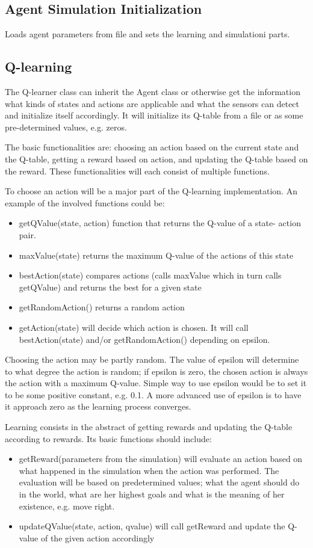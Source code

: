 \documentclass{article}
\begin{document}
\subsection{Agent Simulation Initialization}
Loads agent parameters from file and sets the learning and simulationi parts.


\subsection{Q-learning}
The Q-learner class can inherit the Agent class or otherwise get the information
what kinds of states and actions are applicable and what the sensors can detect
and initialize itself accordingly. It will initialize its Q-table from a file or
as some pre-determined values, e.g. zeros.

The basic functionalities are: choosing an action based on the current state and
the Q-table, getting a reward based on action, and updating the Q-table based on
the reward. These functionalities will each consist of multiple functions.

To choose an action will be a major part of the Q-learning implementation. An
example of the involved functions could be:
\begin{itemize}
  \item getQValue(state, action) function that returns the Q-value of a state-
    action pair.
  \item maxValue(state) returns the maximum Q-value of the actions of this state
  \item bestAction(state) compares actions (calls maxValue which in turn calls
    getQValue) and returns the best for a given state
  \item getRandomAction() returns a random action
  \item getAction(state) will decide which action is chosen. It will call
    bestAction(state) and/or getRandomAction() depending on epsilon.
\end{itemize}
Choosing the action may be partly random. The value of epsilon will determine to
what degree the action is random; if epsilon is zero, the chosen action is always
the action with a maximum Q-value. Simple way to use epsilon would be to set it
to be some positive constant, e.g. 0.1. A more advanced use of epsilon is to have
it approach zero as the learning process converges.

Learning consists in the abstract of getting rewards and updating the Q-table
according to rewards. Its basic functions should include:
\begin{itemize}
  \item getReward(parameters from the simulation) will evaluate an action based
  on what happened in the simulation when the action was performed. The evaluation
  will be based on predetermined values; what the agent should do in the world,
  what are her highest goals and what is the meaning of her existence, e.g. move
  right.
  \item updateQValue(state, action, qvalue) will call getReward and update the
  Q-value of the given action accordingly
\end{itemize}
\end{document}
